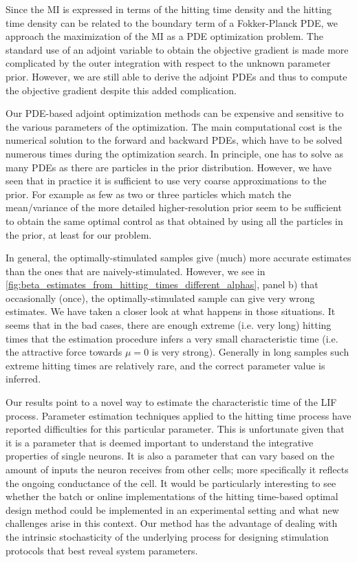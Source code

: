 \documentclass[12pt]{article}
\begin{document}
Since the MI is expressed in terms of the hitting time density
and the hitting time density can be related to the boundary term of a
Fokker-Planck PDE, we approach the maximization of the MI as a
PDE optimization problem. The standard use of an adjoint variable to obtain the
objective gradient is made more complicated by the outer integration with
respect to the unknown parameter prior. However, we are still able to derive the
adjoint PDEs and thus to compute the objective gradient despite this added
complication.
 
Our PDE-based adjoint optimization methods can be expensive and sensitive to the
various parameters of the optimization. The main computational cost is the
numerical solution to the forward and backward PDEs, which have to be solved
numerous times during the optimization search. In principle, one has to solve as
many PDEs as there are particles in the prior distribution. However, we have
seen that in practice it is sufficient to use very coarse approximations to the
prior. For example as few as two or three particles which match the
mean/variance of the more detailed higher-resolution prior seem to be sufficient
to obtain the same optimal control as that obtained by using all the particles
in the prior, at least for our problem.
 
In general, the optimally-stimulated samples give (much) more accurate estimates
than the ones that are naively-stimulated. However, we see in
\cref{fig:beta_estimates_from_hitting_times_different_alphas}, panel b) that
occasionally (once), the optimally-stimulated sample can give very wrong
estimates. We have taken a closer look at what happens in those situations. 
It seems that in the bad cases, there are enough extreme (i.e. very long)
hitting times that the estimation procedure infers a very small characteristic
time (i.e. the attractive force towards $\mu=0$ is very strong). Generally in
long samples such extreme hitting times are relatively rare, and the correct
parameter value is inferred.

Our results point to a novel way to estimate the characteristic time of the LIF
process. Parameter estimation techniques applied to the hitting time process
have reported difficulties for this particular parameter. This is unfortunate
given that it is a parameter that is deemed important to understand the
integrative properties of single neurons. It is also a parameter that can vary
based on the amount of inputs the neuron receives from other cells; more
specifically it reflects the ongoing conductance of the cell. It would be
particularly interesting to see whether the batch or online implementations of
the hitting time-based optimal design method could be implemented in an
experimental setting and what new challenges arise in this context. Our method
has the advantage of dealing with the intrinsic stochasticity of the underlying
process for designing stimulation protocols that best reveal system parameters.
 
\end{document}
